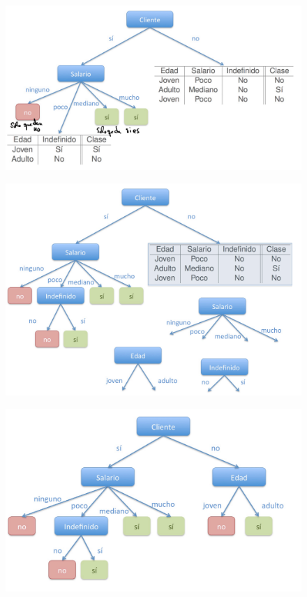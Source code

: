 \documentclass[12pt, twoside, openright]{report} %
\begin{document}
\begin{figure}[H]
	{\includegraphics[scale=.2]{Untitled 7.png}}
\end{figure}
\begin{figure}[H]
	{\includegraphics[scale=.2]{Untitled 8.png}}
\end{figure}
\begin{figure}[H]
	{\includegraphics[scale=.2]{Untitled 9.png}}
\end{figure}
\end{document}
